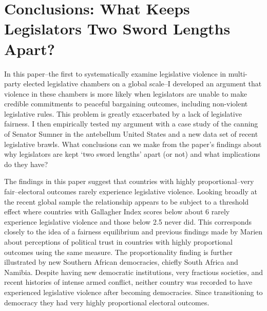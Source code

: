 \documentclass[a4paper]{article}\usepackage[]{graphicx}\usepackage[]{color}
\begin{document}
\section*{Conclusions: What Keeps Legislators Two Sword Lengths Apart?}

In this paper--the first to systematically examine legislative violence in multi-party elected legislative chambers on a global scale--I developed an argument that violence in these chambers is more likely when legislators are unable to make credible commitments to peaceful bargaining outcomes, including non-violent legislative rules. This problem is greatly exacerbated by a lack of legislative fairness. I then empirically tested my argument with a case study of the canning of Senator Sumner in the antebellum United States and a new data set of recent legislative brawls. What conclusions can we make from the paper's findings about why legislators are kept `two sword lengths' apart (or not) and what implications do they have?

The findings in this paper suggest that countries with highly proportional--very fair--electoral outcomes rarely experience legislative violence. Looking broadly at the recent global sample the relationship appears to be subject to a threshold effect where countries with Gallagher Index scores below about 6 rarely experience legislative violence and those below 2.5 never did. This corresponds closely to the idea of a fairness equilibrium and previous findings made by Marien \citeyearpar{Marien2011} about perceptions of political trust in countries with highly proportional outcomes using the same measure. The proportionality finding is further illustrated by new Southern African democracies, chiefly South Africa and Namibia. Despite having new democratic institutions, very fractious societies, and recent histories of intense armed conflict, neither country was recorded to have experienced legislative violence after becoming democracies. Since transitioning to democracy they had very highly proportional electoral outcomes.   
\end{document}
